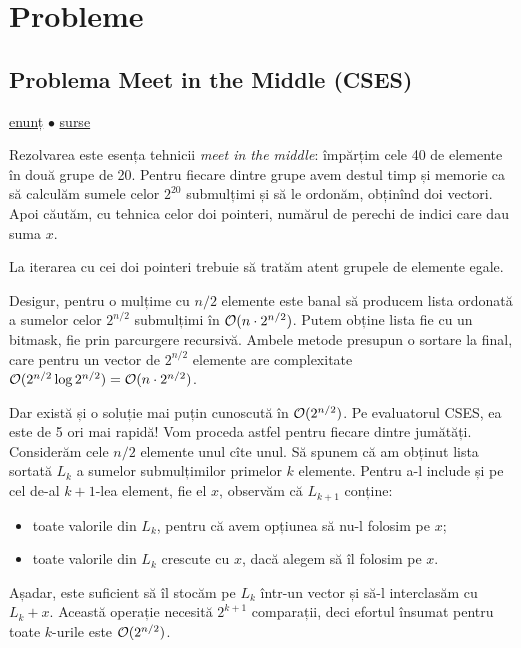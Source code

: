 \documentclass[../main.tex]{subfiles}
\begin{document}
\section{Probleme}

\subsection{Problema Meet in the Middle (CSES)}
\label{problem:meet-in-the-middle}

\href{https://cses.fi/problemset/task/1628/}{enunț}
$\bullet$
\hyperref[code:meet-in-the-middle]{surse}

Rezolvarea este esența tehnicii \textit{meet in the middle}: împărțim cele 40 de elemente în două grupe de 20. Pentru fiecare dintre grupe avem destul timp și memorie ca să calculăm sumele celor $2^{20}$ submulțimi și să le ordonăm, obținînd doi vectori. Apoi căutăm, cu tehnica celor doi pointeri, numărul de perechi de indici care dau suma $x$.

La iterarea cu cei doi pointeri trebuie să tratăm atent grupele de elemente egale.

Desigur, pentru o mulțime cu $n/2$ elemente este banal să producem lista ordonată a sumelor celor $2^{n/2}$ submulțimi în $\mathcal{O}(n \cdot 2^{n/2})$. Putem obține lista fie cu un bitmask, fie prin parcurgere recursivă. Ambele metode presupun o sortare la final, care pentru un vector de $2^{n/2}$ elemente are complexitate $\mathcal{O}(2^{n/2} \log 2^{n/2}) = \mathcal{O}(n \cdot 2^{n/2})$.

Dar există și o soluție mai puțin cunoscută în $\mathcal{O}(2^{n/2})$. Pe evaluatorul CSES, ea este de 5 ori mai rapidă! Vom proceda astfel pentru fiecare dintre jumătăți. Considerăm cele $n/2$ elemente unul cîte unul. Să spunem că am obținut lista sortată $L_k$ a sumelor submulțimilor primelor $k$ elemente. Pentru a-l include și pe cel de-al $k+1$-lea element, fie el $x$, observăm că $L_{k+1}$ conține:

\begin{itemize}
  \item toate valorile din $L_{k}$, pentru că avem opțiunea să nu-l folosim pe $x$;
  \item toate valorile din $L_{k}$ crescute cu $x$, dacă alegem să îl folosim pe $x$.
\end{itemize}

Așadar, este suficient să îl stocăm pe $L_{k}$ într-un vector și să-l interclasăm cu $L_{k} + x$. Această operație necesită $2^{k + 1}$ comparații, deci efortul însumat pentru toate $k$-urile este $\mathcal{O}(2^{n/2})$.
\end{document}
